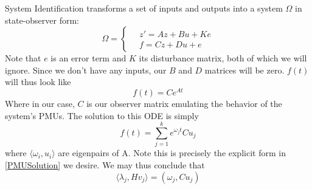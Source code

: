 System Identification transforms a set of inputs and outputs into a system $\Omega$ in state-observer form:
\[
  \Omega=\begin{cases}
               \quad z' = Az + Bu + Ke\\
               \quad f = Cz + Du + e
            \end{cases}
\]
Note that $e$ is an error term and $K$ its disturbance matrix, both of which we will ignore. Since we don't have any inputs, our $B$ and $D$ matrices will be zero. $f(t)$ will thus look like 
\begin{equation}
    f(t) = Ce^{At}
\end{equation}
Where in our case, $C$ is our observer matrix emulating the behavior of the system's PMUs. The solution to this ODE is simply
\begin{equation}\label{spuriousweights}
    f(t) = \sum_{j = 1}^{k} e^{\omega_jt}Cu_j 
\end{equation}
where $ \langle \omega_i, u_i \rangle $ are eigenpairs of A. Note this is precisely the explicit form in \ref{PMUSolution} we desire. We may thus conclude that 
\begin{equation}
     \langle {\lambda_j}, H{v_j} \rangle = (\omega_j, Cu_j)
\end{equation}

